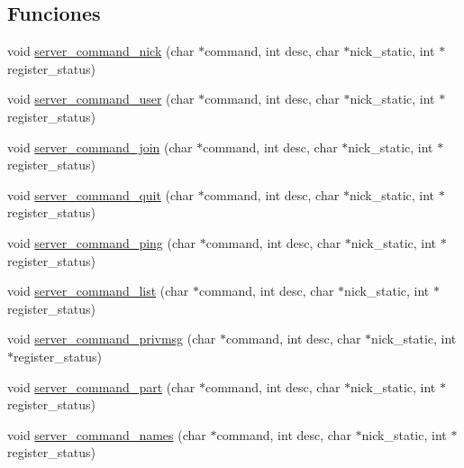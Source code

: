 \subsection*{Funciones}
\begin{DoxyCompactItemize}
\item 
void \hyperlink{G-2313-06-P1__function__handlers_8h_aeefab469ba48ce1655dd5afd14f104b4}{server\+\_\+command\+\_\+nick} (char $\ast$command, int desc, char $\ast$nick\+\_\+static, int $\ast$register\+\_\+status)
\item 
void \hyperlink{G-2313-06-P1__function__handlers_8h_ad09156d6bd4cf58f4345e0bf851ff099}{server\+\_\+command\+\_\+user} (char $\ast$command, int desc, char $\ast$nick\+\_\+static, int $\ast$register\+\_\+status)
\item 
void \hyperlink{G-2313-06-P1__function__handlers_8h_a375c143c5469d1bb4fa7793b310ad68e}{server\+\_\+command\+\_\+join} (char $\ast$command, int desc, char $\ast$nick\+\_\+static, int $\ast$register\+\_\+status)
\item 
void \hyperlink{G-2313-06-P1__function__handlers_8h_a3df99a1f2cefc2d91d65cbb6dd555f96}{server\+\_\+command\+\_\+quit} (char $\ast$command, int desc, char $\ast$nick\+\_\+static, int $\ast$register\+\_\+status)
\item 
void \hyperlink{G-2313-06-P1__function__handlers_8h_acc1c181bf44087b9216d1b59809937aa}{server\+\_\+command\+\_\+ping} (char $\ast$command, int desc, char $\ast$nick\+\_\+static, int $\ast$register\+\_\+status)
\item 
void \hyperlink{G-2313-06-P1__function__handlers_8h_af289e3cc397e24e9b8c12c35bce68285}{server\+\_\+command\+\_\+list} (char $\ast$command, int desc, char $\ast$nick\+\_\+static, int $\ast$register\+\_\+status)
\item 
void \hyperlink{G-2313-06-P1__function__handlers_8h_a8daf68135f2d9e9412c04a2980bdfb2f}{server\+\_\+command\+\_\+privmsg} (char $\ast$command, int desc, char $\ast$nick\+\_\+static, int $\ast$register\+\_\+status)
\item 
void \hyperlink{G-2313-06-P1__function__handlers_8h_aba1a3da1fb58bb35076e7ea56037463e}{server\+\_\+command\+\_\+part} (char $\ast$command, int desc, char $\ast$nick\+\_\+static, int $\ast$register\+\_\+status)
\item 
void \hyperlink{G-2313-06-P1__function__handlers_8h_a0fe05d80af27ae220f8fa631468606ea}{server\+\_\+command\+\_\+names} (char $\ast$command, int desc, char $\ast$nick\+\_\+static, int $\ast$register\+\_\+status)
\item 

\end{DoxyCompactItemize}
